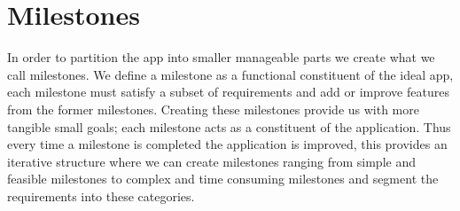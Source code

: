 \section{Milestones}\label{sec:milestones}
In order to partition the app into smaller manageable parts we create what we call milestones.
We define a milestone as a functional constituent of the ideal app, each milestone must satisfy a subset of requirements and add or improve features from the former milestones.
Creating these milestones provide us with more tangible small goals; each milestone acts as a constituent of the application.
Thus every time a milestone is completed the application is improved, this provides an iterative structure where we can create milestones ranging from simple and feasible milestones to complex and time consuming milestones and segment the requirements into these categories.

